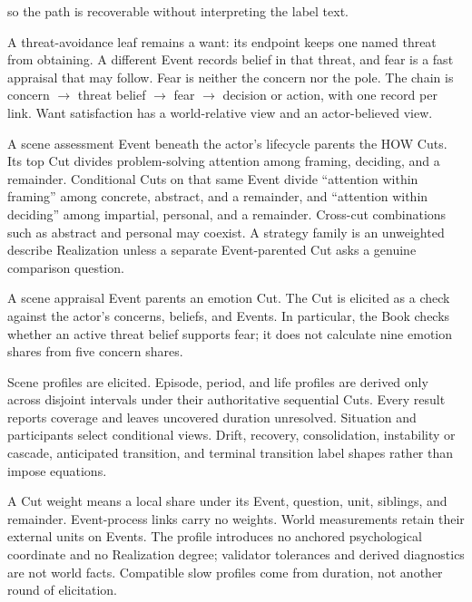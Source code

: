 \documentclass[11pt,a4paper]{article}
\begin{document}
\begin{description}
    so the path is recoverable without interpreting the label text.
  \item[P3 Appraisal chain.] A threat-avoidance leaf remains a want: its
    endpoint keeps one named threat from obtaining. A different Event records
    belief in that threat, and fear is a fast appraisal that may follow. Fear
    is neither the concern nor the pole. The chain is
    concern $\rightarrow$ threat belief $\rightarrow$ fear $\rightarrow$
    decision or action, with one record per link. Want satisfaction has a
    world-relative view and an actor-believed view.
  \item[P4 Problem solving (HOW).] A scene assessment Event beneath the actor's
    lifecycle parents the HOW Cuts. Its top Cut divides problem-solving attention
    among framing, deciding, and a remainder. Conditional Cuts on that same
    Event divide ``attention within framing'' among concrete, abstract, and a
    remainder, and ``attention within deciding'' among impartial, personal,
    and a remainder. Cross-cut combinations such as abstract and personal may
    coexist. A strategy family is an unweighted \textsf{describe} Realization
    unless a separate Event-parented Cut asks a genuine comparison question.
  \item[P5 Feeling (FEELS).] A scene appraisal Event parents an emotion Cut.
    The Cut is elicited as a check against the actor's concerns, beliefs, and
    Events. In particular, the Book checks whether an active threat belief
    supports fear; it does not calculate nine emotion shares from five concern
    shares.
  \item[P6 Time and conditionality.] Scene profiles are elicited. Episode,
    period, and life profiles are derived only across disjoint intervals under
    their authoritative sequential Cuts. Every result reports coverage and
    leaves uncovered duration unresolved. Situation and participants select
    conditional views. Drift, recovery, consolidation, instability or cascade,
    anticipated transition, and terminal transition label shapes rather than
    impose equations.
  \item[P7 Numbers.] A Cut weight means a local share under its Event, question,
    unit, siblings, and remainder. Event-process links carry no weights. World
    measurements retain their external units on Events. The profile introduces
    no anchored psychological coordinate and no Realization degree; validator
    tolerances and derived diagnostics are not world facts. Compatible slow
    profiles come from duration, not another round of elicitation.
\end{description}
\end{document}
